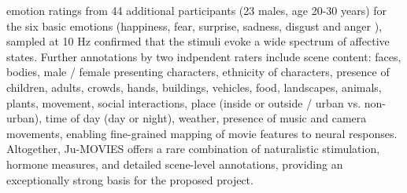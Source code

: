 \documentclass[11pt,a4paper]{article}
\begin{document}
emotion ratings from 44 additional participants (23 males, age 20-30 years)
for the six basic emotions (happiness, fear, surprise, sadness, disgust and anger \parencite{ekmanConstantsCulturesFace1971a}), 
sampled at 10 Hz confirmed that the stimuli evoke a wide spectrum of affective states. 
Further annotations by two indpendent raters include scene content: faces, bodies, male / female presenting characters, ethnicity of characters, presence of children, 
adults, crowds, hands, buildings, vehicles, food, landscapes, animals, plants, movement, social interactions, 
place (inside or outside / urban vs. non-urban), time of day (day or night), weather, presence of music and 
camera movements, enabling fine-grained mapping of movie features to neural responses.
Altogether, Ju-MOVIES offers a rare combination of naturalistic stimulation, hormone measures, 
and detailed scene-level annotations, providing an exceptionally strong basis for the proposed project.
\end{document}

